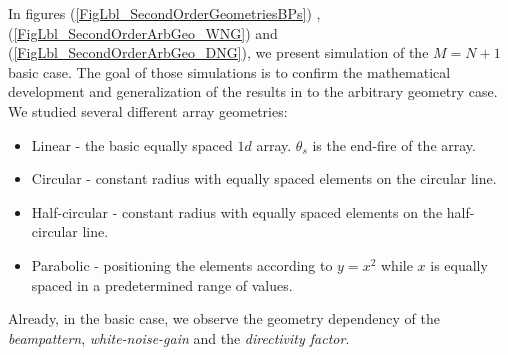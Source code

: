 \documentclass{article}
\begin{document}
In figures (\ref{FigLbl_SecondOrderGeometriesBPs}) ,(\ref{FigLbl_SecondOrderArbGeo_WNG})  and (\ref{FigLbl_SecondOrderArbGeo_DNG}), we present simulation of the $ M=N+1 $ basic case. The goal of those simulations is to confirm the mathematical development and generalization of the results in \cite{sps17} to the arbitrary geometry case. We studied several different array geometries:
\begin{itemize}
	\item Linear - the basic equally spaced $ 1d $ array. $ \theta_s $ is the end-fire of the array.
	\item Circular - constant radius with equally spaced elements on the circular line. 
	\item Half-circular - constant radius with equally spaced elements on the half-circular line.
	\item Parabolic - positioning the elements according to $ y=x^2 $ while $ x $ is equally spaced in a predetermined range of values.
\end{itemize}
Already, in the basic case, we observe the geometry dependency of the \textit{beampattern}, \textit{white-noise-gain} and the \textit{directivity factor}.
\end{document}
